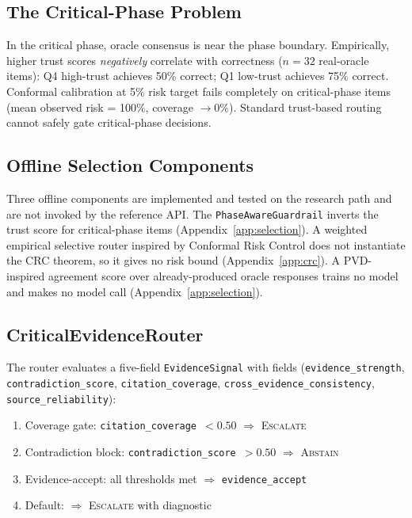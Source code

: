 \documentclass[10pt,twocolumn]{article}
\begin{document}
\subsection{The Critical-Phase Problem}

In the critical phase, oracle consensus is near the phase boundary.
Empirically, higher trust scores \emph{negatively} correlate with
correctness ($n=32$ real-oracle items): Q4 high-trust achieves 50\%
correct; Q1 low-trust achieves 75\% correct. Conformal calibration at
5\% risk target fails completely on critical-phase items (mean
observed risk = 100\%, coverage $\rightarrow 0\%$). Standard trust-based
routing cannot safely gate critical-phase decisions.

\subsection{Offline Selection Components}
\label{sec:crc}

Three offline components are implemented and tested on the research path
and are not invoked by the reference API. The
\texttt{PhaseAwareGuardrail} inverts the trust score for critical-phase
items (Appendix~\ref{app:selection}). A weighted empirical selective
router inspired by Conformal Risk Control does not instantiate the CRC
theorem, so it gives no risk bound (Appendix~\ref{app:crc}). A
PVD-inspired agreement score over already-produced oracle responses
trains no model and makes no model call (Appendix~\ref{app:selection}).

\subsection{CriticalEvidenceRouter}

The router evaluates a five-field \texttt{EvidenceSignal}
with fields (\texttt{evidence\_strength}, \texttt{contradiction\_\allowbreak score},
\texttt{citation\_coverage},
\texttt{cross\_evidence\_\allowbreak consistency},
\texttt{source\_reliability}):

\begin{enumerate}[leftmargin=*,label=\arabic*.]
  \item Coverage gate: \texttt{citation\_coverage}~$< 0.50$ $\Rightarrow$ \textsc{Escalate}
  \item Contradiction block: \texttt{contradiction\_score}~$> 0.50$ $\Rightarrow$ \textsc{Abstain}
  \item Evidence-accept: all thresholds met $\Rightarrow$ \texttt{evidence\_accept}
  \item Default: $\Rightarrow$ \textsc{Escalate} with diagnostic
\end{enumerate}
\end{document}
